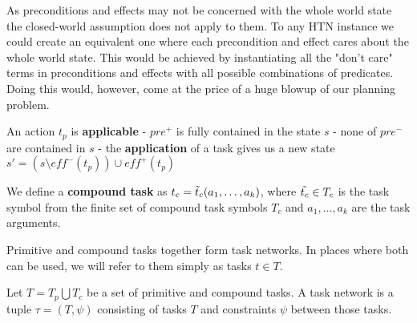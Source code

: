 As preconditions and effects may not be concerned with the whole world state the closed-world assumption does not apply to them. To any HTN instance we could create an equivalent one where each precondition and effect cares about the whole world state. This would be achieved by instantiating all the "don't care" terms in preconditions and effects with all possible combinations of predicates. Doing this would, however, come at the price of a huge blowup of our planning problem. \\

\begin{definition} %
	An action $t_p$ is \textbf{applicable}
	- $pre^+$ is fully contained in the state $s$
	- none of $pre^-$ are contained in $s$
	- the \textbf{application} of a task gives us a new state $s' = (s \setminus eff^-(t_p)) \cup eff^+(t_p)$
\end{definition}

\begin{definition} %
	We define a \textbf{compound task} as $t_c = \Tilde{t}_c(a_1, \ldots, a_k)$, where $\Tilde{t_c} \in T_c$ is the task symbol from the finite set of compound task symbols $T_c$ and $a_1, \ldots, a_k$ are the task arguments.
\end{definition}
Primitive and compound tasks together form task networks. In places where both can be used, we will refer to them simply as tasks $t \in T$.

\begin{definition} %
	Let $T = T_p \bigcup T_c$ be a set of primitive and compound tasks. A task network is a tuple $\tau = (T, \psi)$ consisting of tasks $T$ and constraints $\psi$ between those tasks.
\end{definition}

